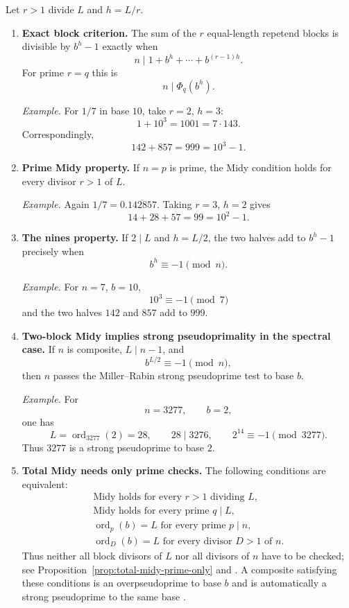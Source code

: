 \documentclass[11pt]{article}
\newcommand{\ord}{\operatorname{ord}}
\begin{document}
Let $r>1$ divide $L$ and $h=L/r$.

\begin{enumerate}[label=\textbf{T\arabic*.},leftmargin=2.2em,resume]
\item \textbf{Exact block criterion.}
The sum of the $r$ equal-length repetend blocks is divisible by $b^h-1$
exactly when
\[
n\mid1+b^h+\cdots+b^{(r-1)h}.
\]
For prime $r=q$ this is
\[
n\mid\Phi_q(b^h).
\]

\smallskip
\noindent\emph{Example.}
For $1/7$ in base $10$, take $r=2$, $h=3$:
\[
1+10^3=1001=7\cdot143.
\]
Correspondingly,
\[
142+857=999=10^3-1.
\]

\item \textbf{Prime Midy property.}
If $n=p$ is prime, the Midy condition holds for every divisor $r>1$ of
$L$.

\smallskip
\noindent\emph{Example.}
Again $1/7=0.\overline{142857}$.  Taking $r=3$, $h=2$ gives
\[
14+28+57=99=10^2-1.
\]

\item \textbf{The nines property.}
If $2\mid L$ and $h=L/2$, the two halves add to $b^h-1$ precisely when
\[
b^h\equiv-1\pmod n.
\]

\smallskip
\noindent\emph{Example.}
For $n=7$, $b=10$,
\[
10^3\equiv-1\pmod7
\]
and the two halves $142$ and $857$ add to $999$.

\item \textbf{Two-block Midy implies strong pseudoprimality in the spectral
case.}
If $n$ is composite, $L\mid n-1$, and
\[
b^{L/2}\equiv-1\pmod n,
\]
then $n$ passes the Miller--Rabin strong pseudoprime test to base $b$.

\smallskip
\noindent\emph{Example.}
For
\[
n=3277,\qquad b=2,
\]
one has
\[
L=\ord_{3277}(2)=28,\qquad 28\mid3276,
\qquad
2^{14}\equiv-1\pmod{3277}.
\]
Thus $3277$ is a strong pseudoprime to base $2$.

\item \textbf{Total Midy needs only prime checks.}
The following conditions are equivalent:
\[
\begin{array}{c}
\text{Midy holds for every }r>1\text{ dividing }L,\\[1mm]
\text{Midy holds for every prime }q\mid L,\\[1mm]
\ord_p(b)=L\text{ for every prime }p\mid n,\\[1mm]
\ord_D(b)=L\text{ for every divisor }D>1\text{ of }n.
\end{array}
\]
Thus neither all block divisors of $L$ nor all divisors of $n$ have to be
checked; see Proposition~\ref{prop:total-midy-prime-only} and
\cite{Castillo2015}.  A composite satisfying these conditions is an
overpseudoprime to base $b$ and is automatically a strong pseudoprime to the
same base \cite{Shevelev2012,Castillo2012}.


\end{enumerate}
\end{document}
